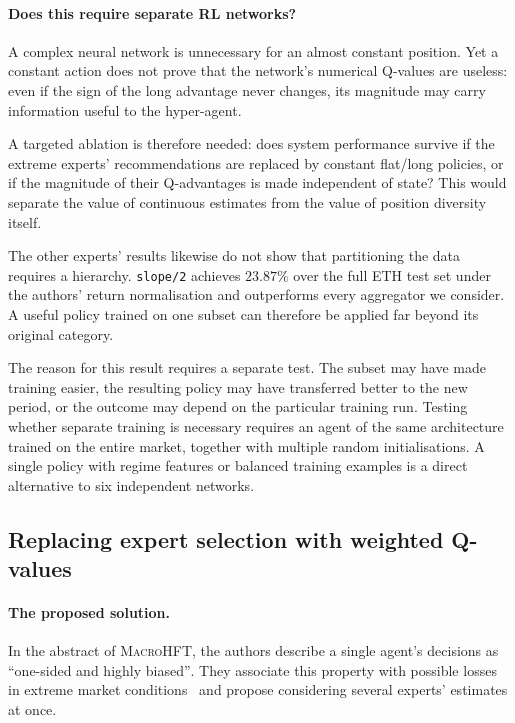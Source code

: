 \documentclass[9pt,a4paper,twocolumn]{extarticle}
\newcommand{\Macro}{\textsc{MacroHFT}}
\begin{document}
\paragraph{Does this require separate RL networks?}

A complex neural network is unnecessary for an almost constant position. Yet a constant action
does not prove that the network's numerical Q-values are useless: even if the sign of the long
advantage never changes, its magnitude may carry information useful to the hyper-agent.

A targeted ablation is therefore needed: does system performance survive if the extreme
experts' recommendations are replaced by constant flat/long policies, or if the magnitude of
their Q-advantages is made independent of state? This would separate the value of continuous
estimates from the value of position diversity itself.

The other experts' results likewise do not show that partitioning the data requires a hierarchy.
\texttt{slope/2} achieves $23.87\%$ over the full ETH test set under the authors' return
normalisation and outperforms every aggregator we consider. A useful policy trained on one
subset can therefore be applied far beyond its original category.

The reason for this result requires a separate test. The subset may have made training easier,
the resulting policy may have transferred better to the new period, or the outcome may depend on
the particular training run. Testing whether separate training is necessary requires an agent of
the same architecture trained on the entire market, together with multiple random initialisations.
A single policy with regime features or balanced training examples is a direct alternative to six
independent networks.

\subsection{Replacing expert selection with weighted Q-values}
\label{sec:q_aggregation}

\paragraph{The proposed solution.}

In the abstract of \Macro{}, the authors describe a single agent's decisions as
\foreignlanguage{english}{\enquote{one-sided and highly biased}}. They associate this property
with possible losses in extreme market conditions~\cite{zong2024macrohft} and propose considering
several experts' estimates at once.
\end{document}

